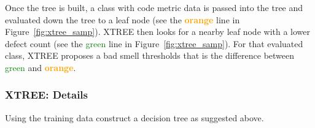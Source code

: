 \documentclass[twocolumn,5p]{elsarticle}
\newcommand{\fig}[1]{Figure~\ref{fig:#1}}
\theoremstyle{break}
\begin{document}
	Once the tree is built, a class with code metric data is passed into the tree and evaluated down the tree to a leaf node (see the \textcolor{orange}{{\bf orange}} line in \fig{xtree_samp}).
	XTREE then looks for a nearby leaf node with a lower defect
	count (see the \textcolor{green}{{green}} line in \fig{xtree_samp}). For that evaluated class, XTREE proposes a bad smell
	thresholds that is  the difference between 
	\textcolor{green}{{green}} and \textcolor{orange}{{\bf orange}}. 
	
	
	\subsubsection{XTREE:   Details}
	
	Using the training data construct a decision tree as suggested above.
	
	
\end{document}
